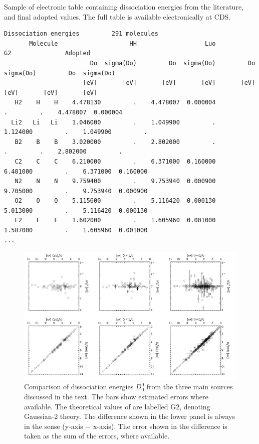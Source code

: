\documentclass[traditabstract]{aa} %
\begin{document}
\begin{table}
\begin{center}
\caption{Sample of electronic table containing dissociation energies from the literature, and final adopted values. The full table is available electronically at CDS.}
\label{tab:diss}
\scriptsize
\begin{verbatim}
Dissociation energies         291 molecules
       Molecule                    HH                   Luo                    G2               Adopted
                        Do  sigma(Do)         Do  sigma(Do)         Do  sigma(Do)         Do  sigma(Do)
                      [eV]       [eV]       [eV]       [eV]       [eV]       [eV]       [eV]       [eV]
   H2    H    H    4.478130         .    4.478007  0.000004           .         .    4.478007  0.000004
  Li2   Li   Li    1.046000         .    1.049900         .    1.124000         .    1.049900         .
   B2    B    B    3.020000         .    2.802000         .           .         .    2.802000         .
   C2    C    C    6.210000         .    6.371000  0.160000    6.401000         .    6.371000  0.160000
   N2    N    N    9.759400         .    9.753940  0.000900    9.705000         .    9.753940  0.000900
   O2    O    O    5.115600         .    5.116420  0.000130    5.013000         .    5.116420  0.000130
   F2    F    F    1.602000         .    1.605960  0.001000    1.587000         .    1.605960  0.001000
...
\end{verbatim}
\end{center}
\end{table} 

  \begin{figure}
   \centering
   \includegraphics[width=180mm,angle=180]{figures/diss.pdf}
      \caption{Comparison of dissociation energies $D_0^0$ from the three main sources discussed in the text. The bars show estimated errors where available.  The theoretical values of \cite{1991JChPh..94.7221C} are labelled G2, denoting Gaussian-2 theory. The difference shown in the lower panel is always in the sense (y-axis $-$ x-axis).  The error shown in the difference is taken as the sum of the errors, where available.
              }
         \label{fig:diss}
   \end{figure}
\end{document}
